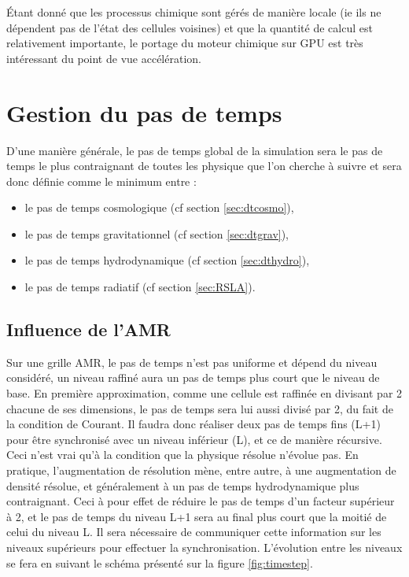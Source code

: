 Étant donné que les processus chimique sont gérés de manière locale (ie ils ne dépendent pas de l'état des cellules voisines) et que la quantité de calcul est relativement importante, le portage du moteur chimique sur \ac{GPU} est très intéressant du point de vue accélération.

\clearpage
\section{Gestion du pas de temps}

D'une manière générale, le pas de temps global de la simulation sera le pas de temps le plus contraignant de toutes les physique que l'on cherche à suivre et sera donc définie comme le minimum entre :

\begin{itemize}
\item le pas de temps cosmologique (cf section \ref{sec:dtcosmo}),
\item le pas de temps gravitationnel (cf section \ref{sec:dtgrav}),
\item le pas de temps hydrodynamique (cf section \ref{sec:dthydro}),
\item le pas de temps radiatif (cf section \ref{sec:RSLA}).
\end{itemize}

\subsection{Influence de l'AMR}

Sur une grille \ac{AMR}, le pas de temps n'est pas uniforme et dépend du niveau considéré, un niveau raffiné aura un pas de temps plus court que le niveau de base.
En première approximation, comme une cellule est raffinée en divisant par 2 chacune de ses dimensions, le pas de temps sera lui aussi divisé par 2, du fait de la condition de Courant.
Il faudra donc réaliser deux pas de temps fins (L+1) pour être synchronisé avec un niveau inférieur (L), et ce de manière récursive.
Ceci n'est vrai qu'à la condition que la physique résolue n'évolue pas.
En pratique, l'augmentation de résolution mène, entre autre, à une augmentation de densité résolue, et généralement à un pas de temps hydrodynamique plus contraignant.
Ceci à pour effet de réduire le pas de temps d'un facteur supérieur à 2, et le pas de temps du niveau L+1 sera au final plus court que la moitié de celui du niveau L.
Il sera nécessaire de communiquer cette information sur les niveaux supérieurs pour effectuer la synchronisation.
L'évolution entre les niveaux se fera en suivant le schéma présenté sur la figure \ref{fig:timestep}.

